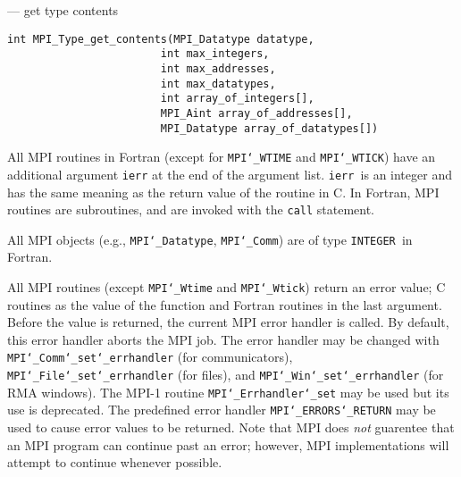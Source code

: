 \startmanpage
{}
--- get type contents 
\startvb\begin{verbatim}
int MPI_Type_get_contents(MPI_Datatype datatype,
                        int max_integers,
                        int max_addresses,
                        int max_datatypes,
                        int array_of_integers[],
                        MPI_Aint array_of_addresses[],
                        MPI_Datatype array_of_datatypes[])

\end{verbatim}
\endvb

\par
{}
\par
{}
All MPI routines in Fortran (except for {\tt MPI{\tt \char`\_}WTIME} and {\tt MPI{\tt \char`\_}WTICK}) have
an additional argument {\tt ierr} at the end of the argument list.  {\tt ierr
}is an integer and has the same meaning as the return value of the routine
in C.  In Fortran, MPI routines are subroutines, and are invoked with the
{\tt call} statement.
\par
All MPI objects (e.g., {\tt MPI{\tt \char`\_}Datatype}, {\tt MPI{\tt \char`\_}Comm}) are of type {\tt INTEGER
}in Fortran.
\par
{}
\par
All MPI routines (except {\tt MPI{\tt \char`\_}Wtime} and {\tt MPI{\tt \char`\_}Wtick}) return an error value;
C routines as the value of the function and Fortran routines in the last
argument.  Before the value is returned, the current MPI error handler is
called.  By default, this error handler aborts the MPI job.  The error handler
may be changed with {\tt MPI{\tt \char`\_}Comm{\tt \char`\_}set{\tt \char`\_}errhandler} (for communicators),
{\tt MPI{\tt \char`\_}File{\tt \char`\_}set{\tt \char`\_}errhandler} (for files), and {\tt MPI{\tt \char`\_}Win{\tt \char`\_}set{\tt \char`\_}errhandler} (for
RMA windows).  The MPI-1 routine {\tt MPI{\tt \char`\_}Errhandler{\tt \char`\_}set} may be used but
its use is deprecated.  The predefined error handler
{\tt MPI{\tt \char`\_}ERRORS{\tt \char`\_}RETURN} may be used to cause error values to be returned.
Note that MPI does {\em not} guarentee that an MPI program can continue past
an error; however, MPI implementations will attempt to continue whenever
possible.
\par
{}
\endmanpage
